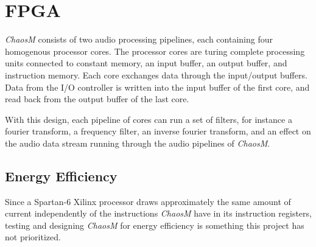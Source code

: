 \FloatBarrier
\section{FPGA}\label{chapter:fpga}

\textit{ChaosM} consists of two audio processing pipelines, each containing four
homogenous processor cores. The processor cores are turing complete processing
units connected to constant memory, an input buffer, an output buffer, and
instruction memory. Each core exchanges data through the input/output buffers.
Data from the I/O controller is written into the input buffer of the first core, and read
back from the output buffer of the last core.

With this design, each pipeline of cores can run a set of filters, for instance
a fourier transform, a frequency filter, an inverse fourier transform, and an
effect on the audio data stream running through the audio pipelines of \textit{ChaosM}.







\subsection{Energy Efficiency}
Since a Spartan-6 Xilinx processor draws approximately the same amount of current
independently of the instructions \textit{ChaosM} have in its instruction registers,
testing and designing \textit{ChaosM} for energy efficiency is something this project
has not prioritized.
